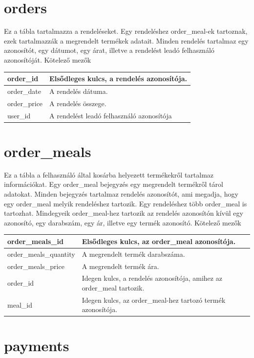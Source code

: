 \section{orders}

Ez a tábla tartalmazza a rendeléseket. Egy rendeléshez order\_meal-ek tartoznak, ezek tartalmazzák a megrendelt termékek adatait. Minden rendelés tartalmaz egy azonosítót, egy dátumot, egy árat, illetve a rendelést leadó felhasználó azonosítóját.
Kötelező mezők

\begin{tabular}{|p{3cm}|p{10cm}|}
\hline
order\_id & Elsődleges kulcs, a rendelés azonosítója. \\
\hline
order\_date & A rendelés dátuma. \\
\hline
order\_price & A rendelés összege. \\
\hline
user\_id & A rendelést leadó felhasználó azonosítója \\
\hline
\end{tabular}

\section{order\_meals}

Ez a tábla a felhasználó által kosárba helyezett termékekről tartalmaz információkat. Egy order\_meal bejegyzés egy megrendelt termékről tárol adatokat. Minden bejegyzés tartalmaz rendelés azonosítót, ami megadja, hogy egy order\_meal melyik rendeléshez tartozik. Egy rendeléshez több order\_meal is tartozhat. Mindegyeik order\_meal-hez tartozik az rendelés azonosítón kívül egy azonosító, egy darabszám, egy ár, illetve egy termék azonosító.
Kötelező mezők

\begin{tabular}{|p{3cm}|p{10cm}|}
    order\_meals\_id & Elsődleges kulcs, az order\_meal azonosítója. \\
    \hline
    order\_meals\_quantity & A megrendelt termék darabszáma. \\
    \hline
    order\_meals\_price & A megrendelt termék ára. \\
    \hline
    order\_id & Idegen kulcs, a rendelés azonosítója, amihez az order\_meal tartozik. \\
    \hline
    meal\_id & Idegen kulcs, az order\_meal-hez tartozó termék azonosítója. \\
    \hline
\end{tabular}

\section{payments}

